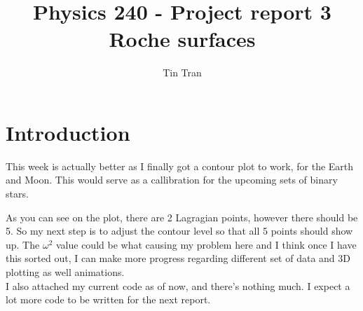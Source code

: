 \documentclass{article}
\begin{document}
\title{Physics 240 - Project report 3\\
		Roche surfaces}
\author{Tin Tran}

\maketitle

\section{Introduction}
This week is actually better as I finally got a contour plot to work, for the Earth and Moon. This would serve as a callibration for the upcoming sets of binary stars. 

\begin{figure}[H]
\end{figure}
As you can see on the plot, there are 2 Lagragian points, however there should be 5. So my next step is to adjust the contour level so that all 5 points should show up. The $\omega^2$ value could be what causing my problem here and I think once I have this sorted out, I can make more progress regarding different set of data and 3D plotting as well animations.\\
I also attached my current code as of now, and there's nothing much. I expect a lot more code to be written for the next report.
\end{document}
